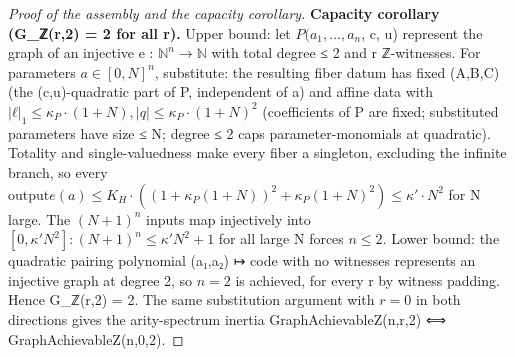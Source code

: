 \begin{proof}[Proof of the assembly and the capacity corollary]
\textbf{Capacity corollary (G\_ℤ(r,2) = 2 for all r).} Upper bound: let $P(a_{1},…,a_{n}$, c, u) represent the graph of an injective e : $ℕ^{n} → ℕ$ with total degree ≤ 2 and r ℤ-witnesses. For parameters $a ∈ [0,N]^{n}$, substitute: the resulting fiber datum has fixed (A,B,C) (the (c,u)-quadratic part of P, independent of a) and affine data with $|ℓ|_{1} ≤ κ_{P}·(1+N), |q| ≤ κ_{P}·(1+N)^{2}$ (coefficients of P are fixed; substituted parameters have size ≤ N; degree ≤ 2 caps parameter-monomials at quadratic). Totality and single-valuedness make every fiber a singleton, excluding the infinite branch, so every $\mathrm{output} e(a) ≤ K_{H}·((1+κ_{P}(1+N))^{2} + κ_{P}(1+N)^{2}) ≤ κ'·N^{2}$ for N large. The $(N+1)^{n}$ inputs map injectively into $[0, κ'N^{2}]: (N+1)^{n} ≤ κ'N^{2} + 1$ for all large N forces $n ≤ 2$. Lower bound: the quadratic pairing polynomial (a₁,a₂) ↦ code with no witnesses represents an injective graph at degree 2, so $n = 2$ is achieved, for every r by witness padding. Hence G\_ℤ(r,2) = 2. The same substitution argument with $r = 0$ in both directions gives the arity-spectrum inertia GraphAchievableZ(n,r,2) ⟺ GraphAchievableZ(n,0,2).

\end{proof}
